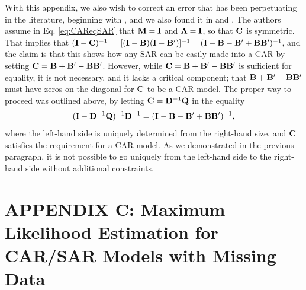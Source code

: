 \documentclass[11pt, titlepage]{article}\usepackage[]{graphicx}\usepackage[]{color}
\begin{document}
\begin{spacing}{1.9}
\begin{flushleft}
With this appendix, we also wish to correct an error that has been perpetuating in the literature, beginning with \citet[p. 89]{Hain:spat:1990}, and we also found it in \citet{Scha:Gotw:stat:2005} and \citet{Dorm:etal:meth:2007}. The authors assume in Eq. \ref{eq:CAReqSAR} that $\mathbf{M} = \mathbf{I}$ and $\mbox{\boldmath $\Lambda$} = \mathbf{I}$, so that $\mathbf{C}$ is symmetric.  That implies that $(\mathbf{I}-\mathbf{C})^{-1}$ = $[(\mathbf{I} - \mathbf{B})(\mathbf{I} - \mathbf{B}^{\prime})]^{-1}$ =$(\mathbf{I} - \mathbf{B} - \mathbf{B}^{\prime} + \mathbf{B}\mathbf{B}^{\prime})^{-1}$, and the claim is that this shows how any SAR can be easily made into a CAR by setting $\mathbf{C} = \mathbf{B} + \mathbf{B}^{\prime} - \mathbf{B}\mathbf{B}^{\prime}$. However, while $\mathbf{C} = \mathbf{B} + \mathbf{B}^{\prime} - \mathbf{B}\mathbf{B}^{\prime}$ is sufficient for equality, it is not necessary, and it lacks a critical component; that $\mathbf{B} + \mathbf{B}^{\prime} - \mathbf{B}\mathbf{B}^{\prime}$ must have zeros on the diagonal for $\mathbf{C}$ to be a CAR model. The proper way to proceed was outlined above, by letting $\mathbf{C} = \mathbf{D}^{-1}\mathbf{Q}$ in the equality 
\[
(\mathbf{I} - \mathbf{D}^{-1}\mathbf{Q})^{-1}\mathbf{D}^{-1} = (\mathbf{I} - \mathbf{B} - \mathbf{B}^{\prime} + \mathbf{B}\mathbf{B}^{\prime})^{-1},
\]
where the left-hand side is uniquely determined from the right-hand size, and $\mathbf{C}$ satisfies the requirement for a CAR model.  As we demonstrated in the previous paragraph, it is not possible to go uniquely from the left-hand side to the right-hand side without additional constraints.


\clearpage
\setcounter{equation}{0}
\renewcommand{\theequation}{C.\arabic{equation}}
\setcounter{figure}{0}
\renewcommand{\thefigure}{C.\arabic{figure}}
\section{APPENDIX C: Maximum Likelihood Estimation for CAR/SAR Models with Missing Data}


\end{flushleft}
\end{spacing}
\end{document}
